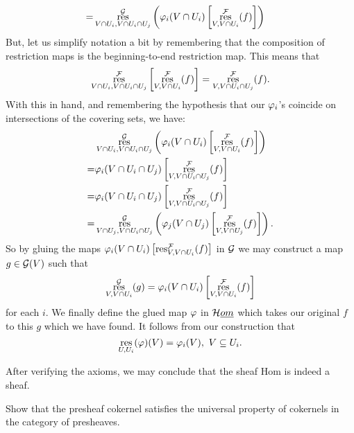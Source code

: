 \documentclass[12pt]{memoir}
\begin{document}
\begin{ptcbr}
\begin{enumerate}[i)]
\begin{align*}
=&\operatorname*{res}^{\mathcal{G}}_{V\cap U_i,V\cap U_i\cap U_j}\left(\varphi_i(V\cap U_i)\left\lbrack\operatorname*{res}^{\mathcal{F}}_{V,V\cap U_i}(f)\right\rbrack\right)
\end{align*}
But, let us simplify notation a bit by remembering that the composition of restriction maps is the beginning-to-end restriction map. This means that 
$$\operatorname*{res}^{\mathcal{F}}_{V\cap U_i,V\cap U_i\cap U_j}\left\lbrack\operatorname*{res}^{\mathcal{F}}_{V,V\cap U_i}(f)\right\rbrack=\operatorname*{res}^{\mathcal{F}}_{V,V\cap U_i\cap U_j}(f).$$
With this in hand, and remembering the hypothesis that our $\varphi_i$'s coincide on intersections of the covering sets, we have:
\begin{align*}
    &\operatorname*{res}^{\mathcal{G}}_{V\cap U_i,V\cap U_i\cap U_j}\left(\varphi_i(V\cap U_i)\left\lbrack\operatorname*{res}^{\mathcal{F}}_{V,V\cap U_i}(f)\right\rbrack\right)\\
    =&\varphi_i(V\cap U_i\cap U_j)\left\lbrack\operatorname*{res}^{\mathcal{F}}_{V,V\cap U_i\cap U_j}(f)\right\rbrack\\
    =&\varphi_i(V\cap U_i\cap U_j)\left\lbrack\operatorname*{res}^{\mathcal{F}}_{V,V\cap U_i\cap U_j}(f)\right\rbrack\\
    =&\operatorname*{res}^{\mathcal{G}}_{V\cap U_j,V\cap U_i\cap U_j}\left(\varphi_j(V\cap U_j)\left\lbrack\operatorname*{res}^{\mathcal{F}}_{V,V\cap U_j}(f)\right\rbrack\right).
\end{align*}
So by gluing the maps $\varphi_i(V\cap U_i)\left\lbrack\operatorname*{res}^{\mathcal{F}}_{V,V\cap U_i}(f)\right\rbrack$ in $\mathcal{G}$ we may construct a map $g\in\mathcal{G}(V)$ such that 
$$\operatorname*{res}_{V,V\cap U_i}^{\mathcal{G}}(g)=\varphi_i(V\cap U_i)\left\lbrack\operatorname*{res}^{\mathcal{F}}_{V,V\cap U_i}(f)\right\rbrack$$
for each $i$. We finally define the glued map $\varphi$ in $\mathcal{H}\emph{om}$ which takes our original $f$ to this $g$ which we have found. It follows from our construction that 
$$\operatorname*{res}_{U,U_i}(\varphi)(V)=\varphi_i(V),\ V\subseteq U_i.$$
\end{enumerate}
After verifying the axioms, we may conclude that the sheaf Hom is indeed a sheaf. 
\end{ptcbr}

\begin{Ej}[2.3.F Vakil]
Show that the presheaf cokernel satisfies the universal property of cokernels in the category of presheaves.
 \end{Ej}
\end{document}
